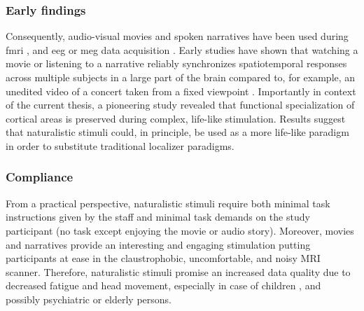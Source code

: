 \subsubsection{Early findings}
Consequently, audio-visual movies and spoken narratives have been used during
\ac{fmri} \citep[s.][for reviews]{hamilton2018revolution,
hasson2008neurocinematics, sonkusare2019naturalistic,
saarimaki2021naturalistic}, and \ac{eeg} or \ac{meg} data acquisition
\citep[s.][for reviews]{alday2019meg, kandylaki2019story}.
Early studies have shown that watching a movie \citep{hasson2004intersubject,
hasson2008neurocinematics, hasson2010reliability} or listening to a narrative
\citep{lerner2011topographic, wilson2008beyond} reliably synchronizes
spatiotemporal responses across multiple subjects in a large part of the brain
compared to, for example, an unedited video of a concert taken from a fixed
viewpoint \citep{hasson2004intersubject, hasson2008neurocinematics,
hasson2010reliability, lerner2011topographic, wilson2008beyond}.
Importantly in context of the current thesis, a pioneering study
\citep{bartels2004mapping} revealed that functional specialization of cortical
areas is preserved during complex, life-like stimulation.
Results suggest that naturalistic stimuli could, in principle, be used as a more
life-like paradigm in order to substitute traditional localizer paradigms.


\subsubsection{Compliance}

From a practical perspective, naturalistic stimuli require both minimal task
instructions given by the staff and minimal task demands on the study
participant (no task except enjoying the movie or audio story).
%
Moreover, movies and narratives provide an interesting and engaging stimulation
putting participants at ease in the claustrophobic, uncomfortable, and noisy MRI
scanner.
%
Therefore, naturalistic stimuli promise an increased data quality due to
decreased fatigue and head movement, especially in case of children
\citep{vanderwal2015inscapes}, and possibly psychiatric
\citep{eickhoff2020towards} or elderly persons.

